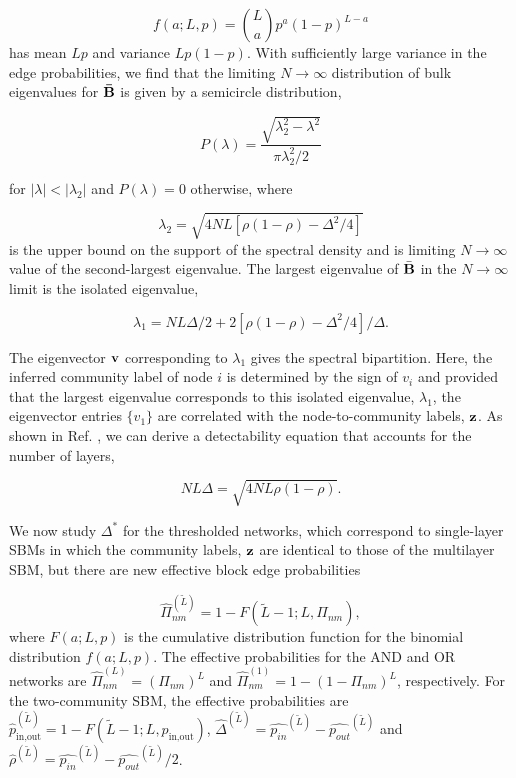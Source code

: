 \begin{equation}
f(a;L,p)={L \choose a}p^{a}(1-p)^{L-a}
\end{equation}
has mean $Lp$ and variance $Lp(1-p)$. With sufficiently large variance in the edge probabilities, we find that the limiting $N\rightarrow \infty$ distribution of bulk eigenvalues for ${\bf \bar{B}}$ is given by a semicircle distribution,

\begin{equation}
P(\lambda)=\frac{\sqrt{\lambda^2_{2}-\lambda^{2}}}{\pi \lambda_{2}^{2}/2}
\end{equation}

for $|\lambda|<|\lambda_{2}|$ and $P(\lambda)=0$ otherwise, where

\begin{equation}
\lambda_{2}=\sqrt{4NL[\rho(1-\rho)-\Delta^{2}/4]}
\end{equation}
is the upper bound on the support of the spectral density and is limiting $N \rightarrow \infty$ value of the second-largest eigenvalue. The largest eigenvalue of $\bar{{\bf B}}$ in the $N \rightarrow \infty$ limit is the isolated eigenvalue,

\begin{equation}
\lambda_{1}=NL\Delta/2+2[\rho(1-\rho)-\Delta^{2}/4]/\Delta. 
\end{equation}

The eigenvector ${\bf v}$ corresponding to $\lambda_{1}$ gives the spectral bipartition. Here, the inferred community label of node $i$ is determined by the sign of $v_{i}$ and provided that the largest eigenvalue corresponds to this isolated eigenvalue, $\lambda_{1}$, the eigenvector entries $\{v_{1}\}$ are correlated with the node-to-community labels, ${\bf z}$.  As shown in Ref. \cite{taylor2015enhanced}, we can derive a detectability equation that accounts for the number of layers,

\begin{equation}
NL\Delta=\sqrt{4NL\rho(1-\rho)}.
\end{equation}

\indent We now study $\Delta^{*}$ for the thresholded networks, which correspond to single-layer SBMs in which the community labels, ${\bf z}$ are identical to those of the multilayer SBM, but there are new effective block edge probabilities

\begin{equation}
\hat{\Pi}_{nm}^{(\tilde{L})}=1-F(\tilde{L}-1;L,\Pi_{nm}),
\end{equation}
where $F(a;L,p)$ is the cumulative distribution function for the binomial distribution $f(a;L,p)$. The effective probabilities for the AND and OR networks are $\hat{\Pi}_{nm}^{(L)}=(\Pi_{nm})^{L}$ and $\hat{\Pi}_{nm}^{(1)}=1-(1-\Pi_{nm})^{L}$, respectively. For the two-community SBM, the effective probabilities are $\hat{p}_{\text{in,out}}^{(\tilde{L})}=1-F(\tilde{L}-1;L,p_{\text{in,out}})$, $\hat{\Delta}^{(\tilde{L})}=\hat{p_{in}}^{(\tilde{L})}-\hat{p_{out}}^{(\tilde{L})}$ and $\hat{\rho}^{(\tilde{L})}=\hat{p_{in}}^{(\tilde{L})}-\hat{p_{out}}^{(\tilde{L})}/2$. 

